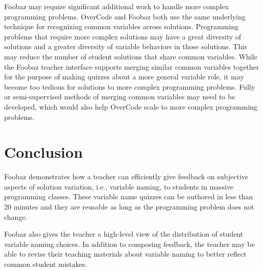 Foobaz may require significant additional work to handle more complex programming problems. OverCode and Foobaz both use the same underlying technique for recognizing common variables across solutions. Programming problems that require more complex solutions may have a great diversity of solutions and a greater diversity of variable behaviors in those solutions. This may reduce the number of student solutions that share common variables. While the Foobaz teacher interface supports merging similar common variables together for the purpose of making quizzes about a more general variable role, it may become too tedious for solutions to more complex programming problems. Fully or semi-supervised methods of merging common variables may need to be developed, which would also help OverCode scale to more complex programming problems.

\section{Conclusion}

Foobaz demonstrates how a teacher can efficiently give feedback on subjective aspects of solution variation, i.e., variable naming, to students in massive programming classes. These variable name quizzes can be authored in less than 20 minutes and they are reusable as long as the programming problem does not change. 

Foobaz also gives the teacher a high-level view of the distribution of student variable naming choices. In addition to composing feedback, the teacher may be able to revise their teaching materials about variable naming to better reflect common student mistakes.



